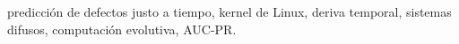 \documentclass[conference,letterpaper]{IEEEtran}
\begin{document}
\begin{IEEEkeywords}
predicción de defectos justo a tiempo, kernel de Linux, deriva temporal, sistemas difusos, computación evolutiva, AUC-PR.
\end{IEEEkeywords}










\end{document}
